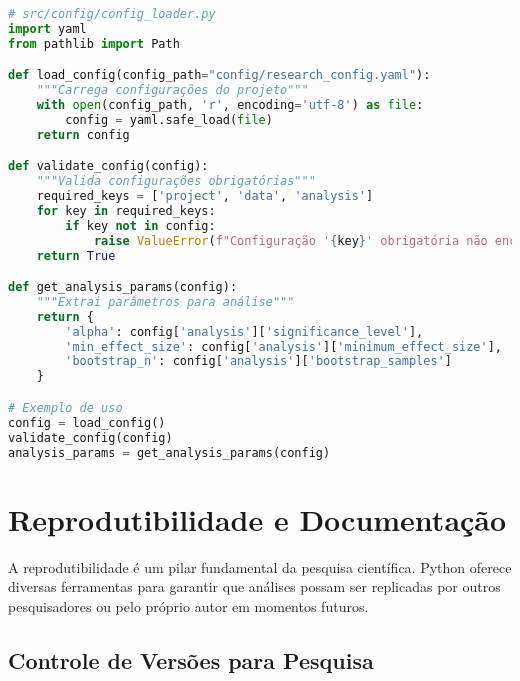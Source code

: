 \begin{pythonbox}
\begin{lstlisting}[language=Python]
# src/config/config_loader.py
import yaml
from pathlib import Path

def load_config(config_path="config/research_config.yaml"):
    """Carrega configurações do projeto"""
    with open(config_path, 'r', encoding='utf-8') as file:
        config = yaml.safe_load(file)
    return config

def validate_config(config):
    """Valida configurações obrigatórias"""
    required_keys = ['project', 'data', 'analysis']
    for key in required_keys:
        if key not in config:
            raise ValueError(f"Configuração '{key}' obrigatória não encontrada")
    return True

def get_analysis_params(config):
    """Extrai parâmetros para análise"""
    return {
        'alpha': config['analysis']['significance_level'],
        'min_effect_size': config['analysis']['minimum_effect_size'],
        'bootstrap_n': config['analysis']['bootstrap_samples']
    }

# Exemplo de uso
config = load_config()
validate_config(config)
analysis_params = get_analysis_params(config)
\end{lstlisting}
\end{pythonbox}

\section{Reprodutibilidade e Documentação}

A reprodutibilidade é um pilar fundamental da pesquisa científica. Python oferece diversas ferramentas para garantir que análises possam ser replicadas por outros pesquisadores ou pelo próprio autor em momentos futuros.

\subsection{Controle de Versões para Pesquisa}

